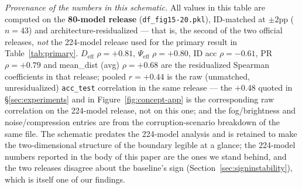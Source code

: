 \documentclass[10pt]{article} %
\newcommand{\srcref}[1]{\S\ref{#1}}
\begin{document}
\noindent\textit{Provenance of the numbers in this schematic.} All values in this table are computed on the \textbf{80-model release} (\texttt{df\_fig15-20.pkl}), ID-matched at $\pm2$pp ($n=43$) and architecture-residualized --- that is, the second of the two official releases, \emph{not} the 224-model release used for the primary result in Table~\ref{tab:primary}. $D_{\mathrm{eff}}$ $\rho=+0.81$, $\Psi_{\mathrm{eff}}$ $\rho=+0.80$, ID acc $\rho=-0.61$, PR $\rho=+0.79$ and mean\_dist (avg) $\rho=+0.68$ are the residualized Spearman coefficients in that release; pooled $r=+0.44$ is the raw (unmatched, unresidualized) \texttt{acc\_test} correlation in the same release --- the $+0.48$ quoted in \srcref{sec:experiments} and in Figure~\ref{fig:concept-app} is the corresponding raw correlation on the 224-model release, not on this one; and the fog/brightness and noise/compression entries are from the corruption-scenario breakdown of the same file. The schematic predates the 224-model analysis and is retained to make the two-dimensional structure of the boundary legible at a glance; the 224-model numbers reported in the body of this paper are the ones we stand behind, and the two releases disagree about the baseline's sign (Section~\ref{sec:signinstability}), which is itself one of our findings.
\end{document}
